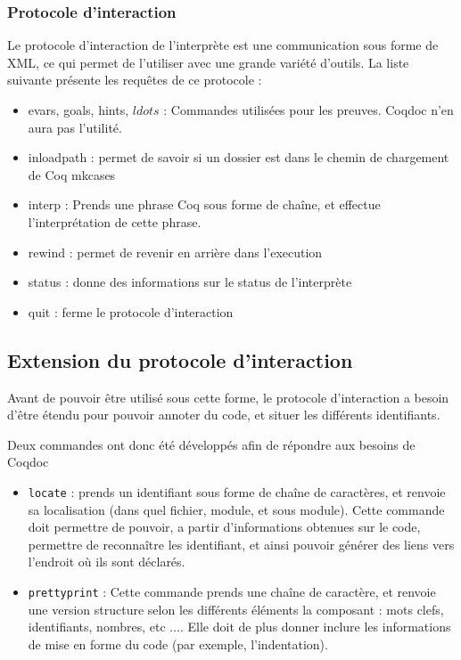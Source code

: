 \documentclass[a4paper, 11pt]{report}
\begin{document}
    \subsubsection{Protocole d'interaction}
    Le protocole d'interaction de l'interprète est une communication sous forme
    de XML, ce qui permet de l'utiliser avec une grande variété d'outils.
    La liste suivante présente les requêtes de ce protocole :
    \begin{itemize}
      \item evars, goals, hints, $ldots$ : Commandes utilisées pour les preuves.
      Coqdoc n'en aura pas l'utilité.
      \item inloadpath : permet de savoir si un dossier est dans le chemin
      de chargement de Coq
      mkcases
      \item interp : Prends une phrase Coq sous forme de chaîne, et effectue
      l'interprétation de cette phrase.
      \item rewind : permet de revenir en arrière dans l'execution
      \item status : donne des informations sur le status de l'interprète
      \item quit : ferme le protocole d'interaction
    \end{itemize}

    \subsection{Extension du protocole d'interaction}
    Avant de pouvoir être utilisé sous cette forme, le protocole d'interaction
    a besoin d'être étendu pour pouvoir annoter du code, et situer les
    différents identifiants.

    Deux commandes ont donc été développés afin de répondre aux besoins de Coqdoc
    \begin{itemize}
      \item \texttt{locate} : prends un identifiant sous forme de chaîne de caractères,
      et renvoie sa localisation (dans quel fichier, module, et sous module).
      Cette commande doit permettre de pouvoir, a partir d'informations obtenues
      sur le code, permettre de reconnaître les identifiant, et ainsi pouvoir
     générer des liens vers l'endroit où ils sont déclarés.
      \item \texttt{prettyprint} :
      Cette commande prends une chaîne de caractère, et renvoie une version
      structure selon les différents éléments la composant : mots clefs,
      identifiants, nombres, etc $\ldots$. Elle doit de plus donner inclure
      les informations de mise en forme du code (par exemple, l'indentation).
    \end{itemize}
\end{document}

